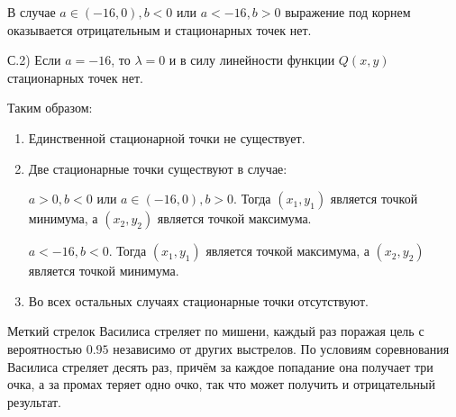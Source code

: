 \documentclass[addpoints, answers]{exam} %
\begin{document}
\begin{questions}
\begin{solution}
В случае $a\in \left(-16,0\right),b<0$ или $a<-16,b>0$ выражение под корнем оказывается отрицательным и стационарных точек нет.

С.2) Если $a=-16$, то $\lambda =0$ и в силу линейности функции $Q(x,y)$ стационарных точек нет. 



Таким образом:

\begin{enumerate}
\item  Единственной стационарной точки не существует.

\item  Две стационарные точки существуют в случае:


$a>0,b<0$ или $a\in \left(-16,0\right),b>0$. Тогда $\left(x_{1} ,y_{1} \right)$ является точкой минимума, а $\left(x_{2} ,y_{2} \right)$ является точкой максимума.

$a<-16,b<0$. Тогда $\left(x_{1} ,y_{1} \right)$ является точкой максимума, а $\left(x_{2} ,y_{2} \right)$ является точкой минимума.

\item Во всех остальных случаях стационарные точки отсутствуют.
\end{enumerate}
\end{solution}


\question  Меткий стрелок Василиса стреляет по мишени, каждый раз поражая цель с вероятностью $0.95$ независимо от других выстрелов. По условиям соревнования Василиса стреляет десять раз, причём за каждое попадание она получает три очка, а за промах теряет одно очко, так что может получить и отрицательный результат.
\end{questions}
\end{document}
